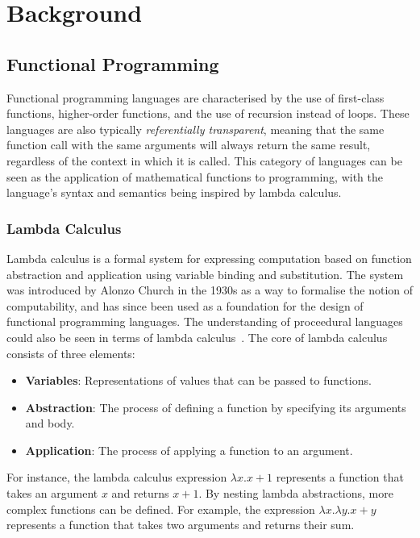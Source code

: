 \chapter{Background}
\label{ch:background}

\section{Functional Programming}

Functional programming languages are characterised by the use of first-class functions, higher-order
functions, and the use of recursion instead of loops. These languages are also typically
\emph{referentially transparent}, meaning that the same function call with the same arguments will
always return the same result, regardless of the context in which it is called. This category
of languages can be seen as the application of mathematical functions to programming, with the
language's syntax and semantics being inspired by lambda calculus.

\subsection{Lambda Calculus}

Lambda calculus is a formal system for expressing computation based on function abstraction and
application using variable binding and substitution. The system was introduced by Alonzo Church in
the 1930s as a way to formalise the notion of computability, and has since been used as a foundation
for the design of functional programming languages. The understanding of proceedural languages could
also be seen in terms of lambda calculus~\autocite{landin1965lambda}. The core of lambda calculus
consists of three elements:

\begin{itemize}
    \onehalfspacing
    \item \textbf{Variables}: Representations of values that can be passed to functions.
    \item \textbf{Abstraction}: The process of defining a function by specifying its arguments and
          body.
    \item \textbf{Application}: The process of applying a function to an argument.
\end{itemize}

For instance, the lambda calculus expression \(\lambda x. x + 1\) represents a function that takes
an argument \(x\) and returns \(x + 1\). By nesting lambda abstractions, more complex functions can
be defined. For example, the expression \(\lambda x. \lambda y. x + y\) represents a function that
takes two arguments and returns their sum.

